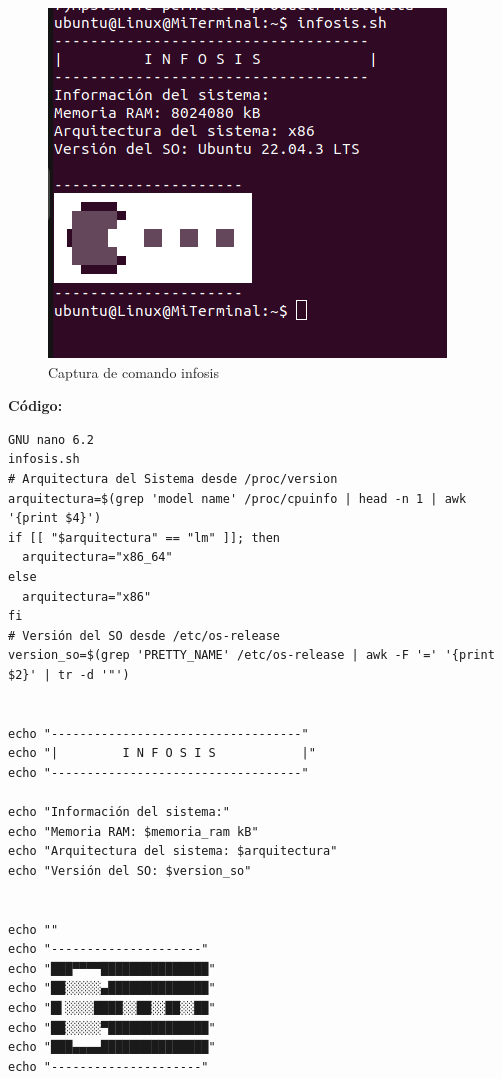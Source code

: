 \documentclass[12pt,a4paper]{article}
\begin{document}
\begin{figure}[H]
    \centering
    \includegraphics[width=\textwidth]{img/infosis.png}
    \caption{Captura de comando infosis}
    \label{infosis}
\end{figure}

\newpage
\textbf{Código:}
\begin{lstlisting}[style=BashInputStyle]
  GNU nano 6.2                                                          infosis.sh                                                                    
# Arquitectura del Sistema desde /proc/version
arquitectura=$(grep 'model name' /proc/cpuinfo | head -n 1 | awk '{print $4}')
if [[ "$arquitectura" == "lm" ]]; then
  arquitectura="x86_64"
else
  arquitectura="x86"
fi
# Versión del SO desde /etc/os-release
version_so=$(grep 'PRETTY_NAME' /etc/os-release | awk -F '=' '{print $2}' | tr -d '"')


echo "-----------------------------------"
echo "|         I N F O S I S            |"
echo "-----------------------------------"

echo "Información del sistema:"
echo "Memoria RAM: $memoria_ram kB"
echo "Arquitectura del sistema: $arquitectura"
echo "Versión del SO: $version_so"


echo ""
echo "---------------------"
echo "███▀▀▀▀███████████████"
echo "██░░░░░▄██████████████"
echo "█▌░░░░████░░██░░██░░██"
echo "██░░░░░▀██████████████"
echo "███▄▄▄▄███████████████"
echo "---------------------"
\end{lstlisting}
\end{document}
